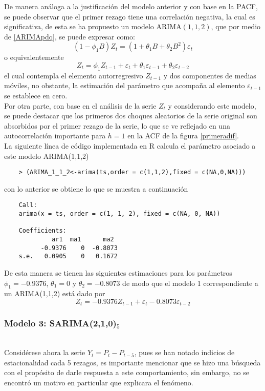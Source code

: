 \documentclass{article}
\theoremstyle{remark}
\begin{document}
De manera análoga a la justificación del modelo anterior y con base en la PACF, se puede observar que el primer rezago tiene una correlación negativa, la cual es significativa, de esta se ha propuesto un modelo ARIMA$(1,1,2)$, que por medio de \eqref{ARIMApdq}, se puede expresar como:
\begin{equation*}
    (1-\phi_1 B)Z_t = (1+ \theta_1 B + \theta_2 B^2) \varepsilon_t
\end{equation*}
o equivalentemente
\begin{equation}
    Z_t = \phi_1 Z_{t-1} + \varepsilon_t + \theta_1\varepsilon_{t-1} + \theta_2 \varepsilon_{t-2}
\end{equation}
el cual contempla el elemento autorregresivo $Z_{t-1}$ y dos componentes de medias móviles, no obstante, la estimación del parámetro  que acompaña al elemento $\varepsilon_{t-1}$ se establece en cero. \\ 

Por otra parte, con base en el análisis de la serie $Z_t$ y considerando este modelo, se puede destacar que los primeros dos choques aleatorios de la serie original son absorbidos por el primer rezago de la serie, lo que se ve reflejado en una autocorrelación importante para $h = 1$ en la ACF de la figura \ref{primeradif}. \\

La siguiente línea de código implementada en R calcula el parámetro asociado a este modelo ARIMA(1,1,2)

\begin{verbatim}
    > (ARIMA_1_1_2<-arima(ts,order = c(1,1,2),fixed = c(NA,0,NA))) 
\end{verbatim}
con lo anterior se obtiene lo que se muestra a continuación
\begin{verbatim}
    Call:
    arima(x = ts, order = c(1, 1, 2), fixed = c(NA, 0, NA))

    Coefficients:
             ar1  ma1      ma2
          -0.9376    0  -0.8073
    s.e.   0.0905    0   0.1672
\end{verbatim}
De esta manera se tienen las siguientes estimaciones para los parámetros $\phi_1=-0.9376$, $\theta_1 =0 $ y $\theta_2 = -0.8073$ de modo que el modelo 1 correspondiente a un ARIMA(1,1,2) está dado por
\begin{equation}
    Z_t = -0.9376 Z_{t-1} + \varepsilon_t  -0.8073\varepsilon_{t-2}
\end{equation}

\subsubsection{Modelo 3: SARIMA(2,1,0)$_5$}\\
Considérese ahora la serie $Y_t = P_t - P_{t-5}$,  pues se han notado indicios de estacionalidad cada 5 rezagos, es importante mencionar que se hizo una búsqueda con el propósito de darle respuesta a este comportamiento, sin embargo, no se encontró un motivo en particular que explicara el fenómeno.\\ 
\end{document}
